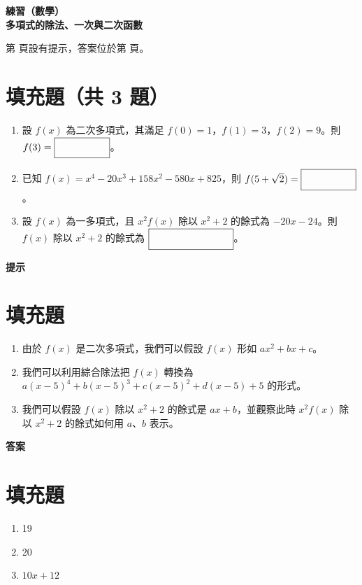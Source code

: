 \documentclass[10pt]{article}
\newcommand*{\blank}[1]{\rule[-.7\baselineskip]{0pt}{1.8\baselineskip}\fbox{\rule[-.4\baselineskip]{0pt}{1.2\baselineskip}\hspace{#1}}}
\renewcommand*{\maketitle}{{%
  \bfseries
  \LARGE 練習（數學） \\
  \large 多項式的除法、一次與二次函數 \par
}}
\begin{document}
\maketitle
\medskip
第 \pageref{hint} 頁設有提示，答案位於第 \pageref{answer} 頁。
\section{填充題（共 3 題）}
\begin{enumerate}[label=\Alph*.,align=left,leftmargin=*,labelsep=.3em]
  \item 設 $f(x)$ 為二次多項式，其滿足 $f(0) = 1$，$f(1) = 3$，$f(2) = 9$。則 $f(3) = \blank{5em}$。
  \newpage
  \item 已知 $f(x) = x^4 - 20x^3 + 158x^2 - 580x + 825$，則 $f(5 + \sqrt{2}) = \blank{5em}$。
  \newpage
  \item 設 $f(x)$ 為一多項式，且 $x^2f(x)$ 除以 $x^2 + 2$ 的餘式為 $-20x - 24$。則 $f(x)$ 除以 $x^2 + 2$ 的餘式為 $\blank{8em}$。
\end{enumerate}

\newpage
\label{hint}
{\bfseries\large 提示 \par}
\setcounter{section}{0}
\section{填充題}
\begin{enumerate}[label=\Alph*.,left=0pt]
  \item 由於 $f(x)$ 是二次多項式，我們可以假設 $f(x)$ 形如 $ax^2 + bx + c$。
  \item 我們可以利用綜合除法把 $f(x)$ 轉換為 $a(x-5)^4 + b(x-5)^3 + c(x-5)^2 + d(x-5) + 5$ 的形式。
  \item 我們可以假設 $f(x)$ 除以 $x^2 + 2$ 的餘式是 $ax + b$，並觀察此時 $x^2f(x)$ 除以 $x^2 + 2$ 的餘式如何用 $a$、$b$ 表示。
\end{enumerate}

\newpage
\label{answer}
{\bfseries\large 答案 \par}
\setcounter{section}{0}
\section{填充題}
\begin{enumerate}[label=\Alph*.,left=0pt]
  \item 19
  \item 20
  \item $10x + 12$
\end{enumerate}
\end{document}
